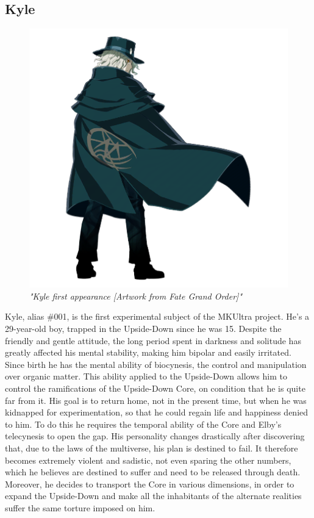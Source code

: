 \subsection{Kyle}

\begin{figure}
	\centering
	\includegraphics[width=0.8\linewidth]{images/characters/kyle_01.png}
	\caption{\textit{"Kyle first appearance [Artwork from Fate Grand Order]"}}
\end{figure}

Kyle, alias \#001, is the first experimental subject of the MKUltra project. He's a 29-year-old boy, trapped in the Upside-Down since he was 15.
Despite the friendly and gentle attitude, the long period spent in darkness and solitude has greatly affected his mental stability, making him bipolar 
and easily irritated. Since birth he has the mental ability of biocynesis, the control and manipulation over organic matter. This ability applied to the 
Upside-Down allows him to control the ramifications of the Upside-Down Core, on condition that he is quite far from it.
His goal is to return home, not in the present time, but when he was kidnapped for experimentation, so that he could regain life and happiness denied to him.
To do this he requires the temporal ability of the Core and Elby's telecynesis to open the gap.
His personality changes drastically after discovering that, due to the laws of the multiverse, his plan is destined to fail. It therefore becomes extremely violent and sadistic, not even sparing the other numbers, which he believes are destined to suffer and need to be released through death. Moreover, he decides
 to transport the Core in various dimensions, in order to expand the Upside-Down and make all the inhabitants of the alternate realities suffer the same torture imposed on him.

